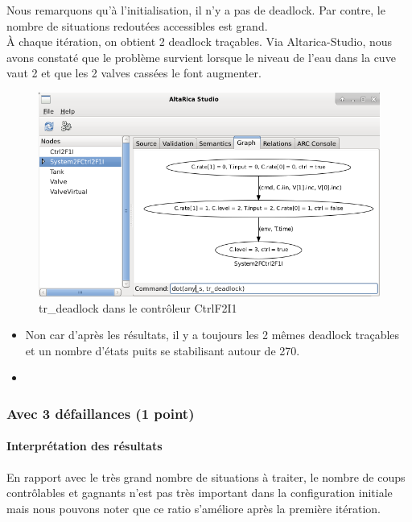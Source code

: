 \documentclass[a4paper]{book}
\begin{document}
Nous remarquons qu'à l'initialisation, il n'y a pas de deadlock. Par contre, le nombre de situations redoutées accessibles est grand. \\
À chaque itération, on obtient 2 deadlock traçables. Via Altarica-Studio, nous avons constaté que le problème survient lorsque le niveau de l'eau dans la cuve vaut 2 et que les 2 valves cassées le font augmenter.

\begin{figure}[H]
  \centering
  \includegraphics[width=14cm]{img/CtrlF2I1.png}
  \caption{tr\_deadlock dans le contrôleur CtrlF2I1}
\end{figure}

\begin{itemize}
	\item Non car d'après les résultats, il y a toujours les 2 mêmes deadlock traçables et un nombre d'états puits se stabilisant autour de 270.
	\item 
\end{itemize}

\subsubsection{Avec 3 défaillances (1 point)}





\paragraph{Interprétation des résultats}

En rapport avec le très grand nombre de situations à traiter, le nombre de coups contrôlables et gagnants n'est pas très important dans la configuration initiale mais nous pouvons noter que ce ratio s'améliore après la première itération.
\end{document}

